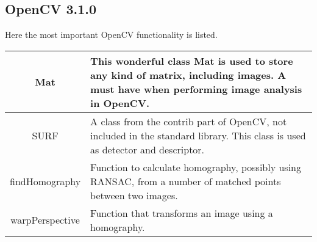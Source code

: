 \appendix

\subsection{OpenCV 3.1.0} \label{appendix:opencv}
Here the most important OpenCV functionality is listed.
\begin{table}[H]
  \centering
  \begin{tabular}{c|p{6cm}}
    Mat & This wonderful class Mat is used to store any kind of matrix, including images. A must have when performing image analysis in OpenCV. \\
    \hline
    SURF & A class from the contrib part of OpenCV, not included in the standard library. This class is used as detector and descriptor. \\
    \hline
    findHomography & Function to calculate homography, possibly using RANSAC, from a number of matched points between two images. \\
    \hline
    warpPerspective & Function that transforms an image using a homography.
  \end{tabular}
\end{table}
